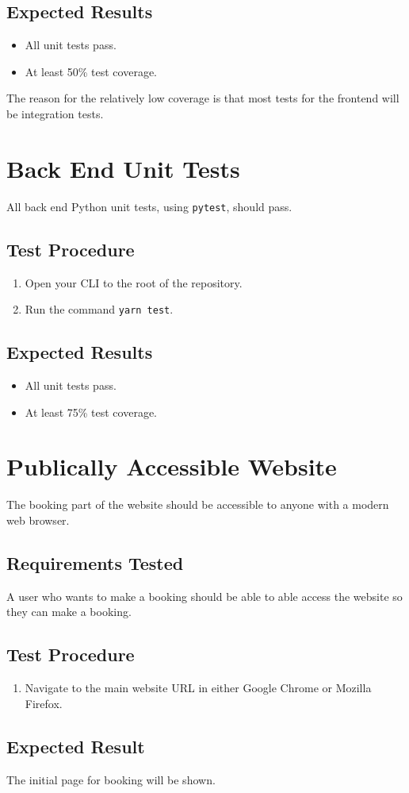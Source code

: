\documentclass[a4paper, draft]{article}
\begin{document}
\subsection{Expected Results}
\begin{itemize}
    \item All unit tests pass.
    \item At least 50\% test coverage.
\end{itemize}
The reason for the relatively low coverage is that most tests for the frontend will be integration tests.

\section{Back End Unit Tests}
All back end Python unit tests, using \texttt{pytest}, should pass.

\subsection{Test Procedure}
\begin{enumerate}
    \item Open your CLI to the root of the repository.
    \item Run the command \texttt{yarn test}.
\end{enumerate}

\subsection{Expected Results}
\begin{itemize}
    \item All unit tests pass.
    \item At least 75\% test coverage.
\end{itemize}

\newpage
\section{Publically Accessible Website}
The booking part of the website should be accessible to anyone with a modern web browser.

\subsection{Requirements Tested}
A user who wants to make a booking should be able to able access the website so they can make a booking.

\subsection{Test Procedure}
\begin{enumerate}
    \item Navigate to the main website URL in either Google Chrome or Mozilla Firefox.
\end{enumerate}

\subsection{Expected Result}
The initial page for booking will be shown.
\end{document}

